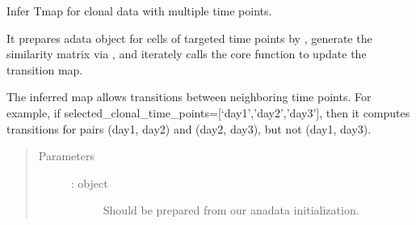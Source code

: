 \documentclass[letterpaper,10pt,english]{sphinxmanual}
\begin{document}
\begin{fulllineitems}
\label{\detokenize{cospar.tmap.infer_Tmap_from_multitime_clones:cospar.tmap.infer_Tmap_from_multitime_clones}}
Infer Tmap for clonal data with multiple time points.

It prepares adata object for cells of targeted time points by
{\hyperref[\detokenize{cospar.tmap.select_time_points:cospar.tmap.select_time_points}]{}}, generate the similarity matrix
via {\hyperref[\detokenize{cospar.tmap.generate_similarity_matrix:cospar.tmap.generate_similarity_matrix}]{}}, and iterately calls
the core function {\hyperref[\detokenize{cospar.tmap.refine_Tmap_through_cospar:cospar.tmap.refine_Tmap_through_cospar}]{}} to update
the transition map.

The inferred map allows transitions between neighboring time points.
For example, if selected\_clonal\_time\_points={[}‘day1’,’day2’,’day3’{]},
then it computes transitions for pairs (day1, day2) and (day2, day3),
but not (day1, day3).
\begin{quote}\begin{description}
\item[{Parameters}] \leavevmode\begin{description}
\item[{ :  object}] \leavevmode
Should be prepared from our anadata initialization.


\end{description}
\end{description}
\end{quote}
\end{fulllineitems}
\end{document}
